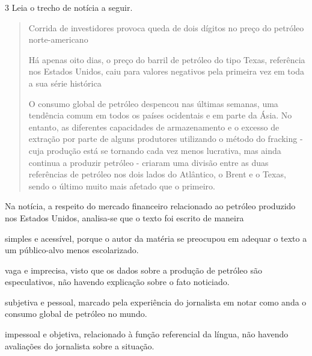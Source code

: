\pagebreak
\num{3} Leia o trecho de notícia a seguir.

\begin{quote}
Corrida de investidores provoca queda de dois dígitos no preço do
petróleo norte-americano

Há apenas oito dias, o preço do barril de petróleo do tipo Texas,
referência nos Estados Unidos, caiu para valores negativos pela primeira
vez em toda a sua série histórica

O consumo global de petróleo despencou nas últimas semanas, uma
tendência comum em todos os países ocidentais e em parte da Ásia. No
entanto, as diferentes capacidades de armazenamento e o excesso de
extração por parte de alguns produtores utilizando o método do fracking
- cuja produção está se tornando cada vez menos lucrativa, mas ainda
continua a produzir petróleo - criaram uma divisão entre as duas
referências de petróleo nos dois lados do Atlântico, o Brent e o Texas,
sendo o último muito mais afetado que o primeiro.

\end{quote}

Na notícia, a respeito do mercado financeiro relacionado ao petróleo
produzido nos Estados Unidos, analisa-se que o texto foi escrito de
maneira

\begin{escolha}
\item simples e acessível, porque o autor da matéria se preocupou em
adequar o texto a um público-alvo menos escolarizado.

\item vaga e imprecisa, visto que os dados sobre a produção de petróleo
são especulativos, não havendo explicação sobre o fato noticiado.

\item subjetiva e pessoal, marcado pela experiência do jornalista em notar
como anda o consumo global de petróleo no mundo.

\item impessoal e objetiva, relacionado à função referencial da língua,
não havendo avaliações do jornalista sobre a situação.
\end{escolha}

